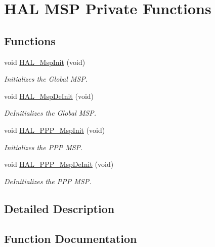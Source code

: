 \hypertarget{group___h_a_l___m_s_p___private___functions}{}\section{H\+AL M\+SP Private Functions}
\label{group___h_a_l___m_s_p___private___functions}
\subsection*{Functions}
\begin{DoxyCompactItemize}
\item 
void \hyperlink{group___h_a_l___m_s_p___private___functions_gae4fb8e66865c87d0ebab74a726a6891f}{H\+A\+L\+\_\+\+Msp\+Init} (void)
\begin{DoxyCompactList}\small\item\em Initializes the Global M\+SP. \end{DoxyCompactList}\item 
void \hyperlink{group___h_a_l___m_s_p___private___functions_gadd10d026ef02d00e32e80c9eab9db830}{H\+A\+L\+\_\+\+Msp\+De\+Init} (void)
\begin{DoxyCompactList}\small\item\em De\+Initializes the Global M\+SP. \end{DoxyCompactList}\item 
void \hyperlink{group___h_a_l___m_s_p___private___functions_ga4f778ad7de857377eb5493377047e72d}{H\+A\+L\+\_\+\+P\+P\+P\+\_\+\+Msp\+Init} (void)
\begin{DoxyCompactList}\small\item\em Initializes the P\+PP M\+SP. \end{DoxyCompactList}\item 
void \hyperlink{group___h_a_l___m_s_p___private___functions_gaca177eaaeb329fc02e292efd92a8ed13}{H\+A\+L\+\_\+\+P\+P\+P\+\_\+\+Msp\+De\+Init} (void)
\begin{DoxyCompactList}\small\item\em De\+Initializes the P\+PP M\+SP. \end{DoxyCompactList}\end{DoxyCompactItemize}


\subsection{Detailed Description}


\subsection{Function Documentation}
\mbox{\label{group___h_a_l___m_s_p___private___functions_gadd10d026ef02d00e32e80c9eab9db830}} 
